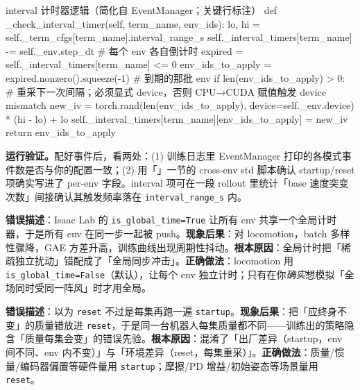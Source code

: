 \begin{codebox}[Python]{interval 计时器逻辑（简化自 EventManager；关键行标注）}
def _check_interval_timer(self, term_name, env_ids):
    lo, hi = self._term_cfgs[term_name].interval_range_s
    self._interval_timers[term_name] -= self._env.step_dt   # 每个 env 各自倒计时
    expired = self._interval_timers[term_name] <= 0
    env_ids_to_apply = expired.nonzero().squeeze(-1)        # 到期的那批 env
    if len(env_ids_to_apply) > 0:
        # 重采下一次间隔；必须显式 device，否则 CPU→CUDA 赋值触发 device mismatch
        new_iv = torch.rand(len(env_ids_to_apply),
                            device=self._env.device) * (hi - lo) + lo
        self._interval_timers[term_name][env_ids_to_apply] = new_iv
    return env_ids_to_apply
\end{codebox}

\textbf{运行验证。}配好事件后，看两处：(1) 训练日志里 EventManager 打印的各模式事件数是否与你的配置一致；(2) 用「」一节的 cross-env std 脚本确认 startup/reset 项确实写进了 per-env 字段。interval 项可在一段 rollout 里统计「base 速度突变次数」间接确认其触发频率落在 \verb|interval_range_s| 内。

\begin{pitfall}[interval 事件的 \texttt{is\_global\_time=True} 导致同步触发]
\textbf{错误描述}：Isaac Lab 的 \verb|is_global_time=True| 让所有 env 共享一个全局计时器，于是所有 env 在同一步一起被 push。\textbf{现象后果}：对 locomotion，batch 多样性骤降，GAE 方差升高，训练曲线出现周期性抖动。\textbf{根本原因}：全局计时把「稀疏独立扰动」错配成了「全局同步冲击」。\textbf{正确做法}：locomotion 用 \verb|is_global_time=False|（默认），让每个 env 独立计时；只有在你\emph{确实}想模拟「全场同时受同一阵风」时才用全局。
\end{pitfall}

\begin{pitfall}
\textbf{错误描述}：以为 \verb|reset| 不过是每集再跑一遍 \verb|startup|。\textbf{现象后果}：把「应终身不变」的质量错放进 \verb|reset|，于是同一台机器人每集质量都不同——训练出的策略隐含「质量每集会变」的错误先验。\textbf{根本原因}：混淆了「出厂差异（startup，env 间不同、env 内不变）」与「环境差异（reset，每集重采）」。\textbf{正确做法}：质量/惯量/编码器偏置等硬件量用 \verb|startup|；摩擦/PD 增益/初始姿态等场景量用 \verb|reset|。
\end{pitfall}

